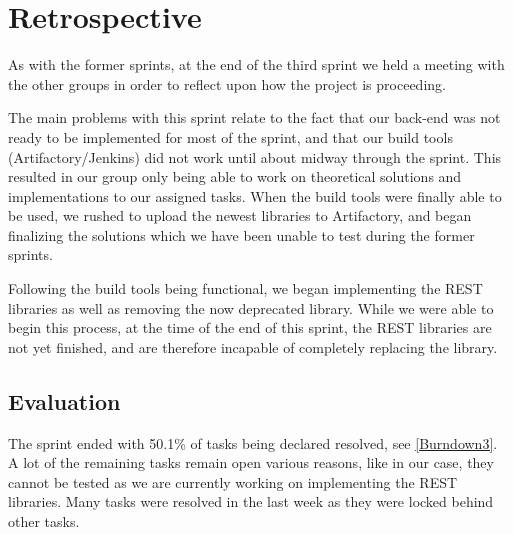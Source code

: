 \section{Retrospective}
As with the former sprints, at the end of the third sprint we held a meeting
with the other groups in order to reflect upon how the project is proceeding.\nl

The main problems with this sprint relate to the fact that our back-end was not
ready to be implemented for most of the sprint, and that our build tools
(Artifactory/Jenkins) did not work until about midway through the sprint.
This resulted in our group only being able to work on theoretical solutions and
implementations to our assigned tasks. When the build tools were finally able to
be used, we rushed to upload the newest libraries to Artifactory, and began
finalizing the solutions which we have been unable to test during the former
sprints.\nl

Following the build tools being functional, we began implementing the REST
libraries as well as removing the now deprecated  library. While
we were able to begin this process, at the time of the end of this sprint, the
REST libraries are not yet finished, and are therefore incapable of completely
replacing the  library.

\subsection{Evaluation}
The sprint ended with 50.1\% of tasks being declared resolved, see
\autoref{Burndown3}. A lot of the remaining tasks remain open various reasons,
like in our case, they cannot be tested as we are currently working on
implementing the REST libraries. Many tasks were resolved in the last week as
they were locked behind other tasks.


